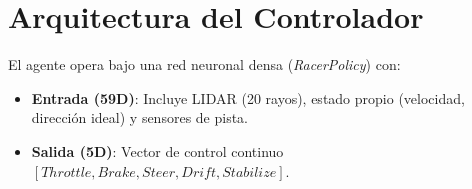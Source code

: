 \documentclass[12pt]{article}
\begin{document}
\section{Arquitectura del Controlador}
El agente opera bajo una red neuronal densa (\textit{RacerPolicy}) con:
\begin{itemize}
    \item \textbf{Entrada (59D)}: Incluye LIDAR (20 rayos), estado propio (velocidad, dirección ideal) y sensores de pista.
    \item \textbf{Salida (5D)}: Vector de control continuo $[Throttle, Brake, Steer, Drift, Stabilize]$.
\end{itemize}
\end{document}

